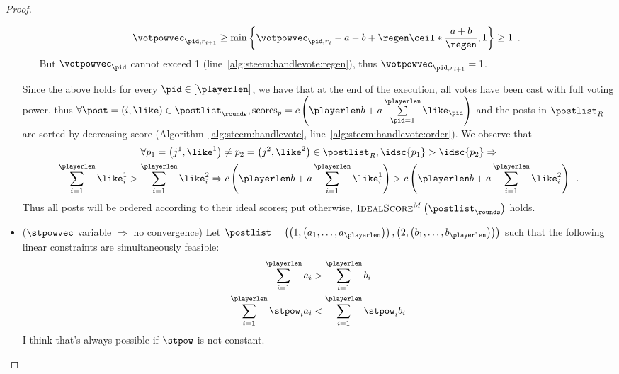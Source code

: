 \begin{proof}
\begin{itemize}
\begin{itemize}
\begin{equation*}
        \votpowvec_{\pid, r_{i + 1}} \geq \min{\left\{\votpowvec_{\pid, r_i} - a
        - b + \regen\ceil*{\frac{a + b}{\regen}}, 1\right\}} \geq 1 \enspace.
      \end{equation*}
      But $\votpowvec_{\pid}$ cannot exceed 1
      (line~\ref{alg:steem:handlevote:regen}), thus $\votpowvec_{\pid, r_{i +
      1}} = 1$.
    \end{itemize}
    Since the above holds for every $\pid \in \left[\playerlen\right]$, we have
    that at the end of the execution, all votes have been cast with full voting
    power, thus $\forall \post = \left(i, \like\right) \in \postlist_\rounds,
    \mathrm{scores}_{p} = c\left(\playerlen b + a \sum\limits_{\pid =
    1}^\playerlen \like_{\pid}\right)$ and the posts in $\postlist_R$ are sorted
    by decreasing score (Algorithm~\ref{alg:steem:handlevote},
    line~\ref{alg:steem:handlevote:order}). We observe that
    \begin{gather*}
      \forall p_1 = \left(j^1, \like^1\right) \neq p_2 = \left(j^2,
      \like^2\right) \in \postlist_R, \idsc{p_1} > \idsc{p_2} \Rightarrow \\
      \sum\limits_{i = 1}^\playerlen \like^1_i > \sum\limits_{i = 1}^\playerlen
      \like^2_i \Rightarrow c\left(\playerlen b + a \sum\limits_{i =
      1}^\playerlen \like^1_i\right) > c\left(\playerlen b + a \sum\limits_{i =
      1}^\playerlen \like^2_i\right) \enspace.
    \end{gather*}
    Thus all posts will be ordered according to their ideal scores; put
    otherwise, $\textsc{IdealScore}^M\left(\postlist_\rounds\right)$ holds.

    \item ($\stpowvec$ variable $\Rightarrow$ no convergence) Let $\postlist =
    \left(\left(1, \left(a_1, \dots, a_\playerlen\right)\right), \left(2,
    \left(b_1, \dots, b_\playerlen\right)\right)\right)$ such that the following
    linear constraints are simultaneously feasible:
    \begin{gather*}
      \sum\limits_{i=1}^\playerlen a_i > \sum\limits_{i=1}^\playerlen b_i \\
      \sum\limits_{i=1}^\playerlen \stpow_i a_i < \sum\limits_{i=1}^\playerlen
      \stpow_i  b_i
    \end{gather*}
    I think that's always possible if $\stpow$ is not constant.


\end{itemize}
\end{proof}

